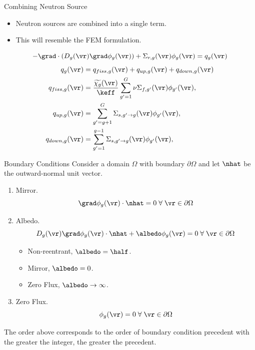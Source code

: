 \begin{frame}{Combining Neutron Source}
  \begin{itemize}
    \item Neutron sources are combined into a single term.
    \item This will resemble the FEM formulation.
  \end{itemize}
  \begin{equation}
    \label{eq:multigroup_source}
    - \grad \cdot( D_g(\vr) \grad \phi_g(\vr)) + \Sigma_{r,g}(\vr) \phi_g(\vr) = 
      q_g(\vr)
  \end{equation}
  \begin{align}
    \label{eq:q}
    q_g(\vr) &= q_{fiss,g}(\vr) + q_{up,g}(\vr) + q_{down,g}(\vr) \\
    \label{eq:qfiss}
    q_{fiss,g}(\vr) &= \frac{\widetilde{\chi_g}(\vr)}{\keff} \sum_{g'=1}^{G} 
      \nu \Sigma_{f,g'}(\vr) \phi_{g'}(\vr), \\
    \label{eq:qup}
    q_{up,g}(\vr) &= \sum_{g'=g+1}^{G} \Sigma_{s,g' \rightarrow g}(\vr)
      \phi_{g'}(\vr), \\
    \label{eq:qdown}
    q_{down,g}(\vr) &= \sum_{g'=1}^{g-1} \Sigma_{s,g' \rightarrow g}(\vr)
      \phi_{g'}(\vr),
  \end{align}
\end{frame}

\begin{frame}{Boundary Conditions}
  Consider a domain $\Omega$ with boundary $\partial \Omega$ and let $\nhat$ be
  the outward-normal unit vector.

  \begin{enumerate}
    \item Mirror.
      \begin{equation}
        \grad \phi_g(\vr) \cdot \nhat = 0 \; \forall \; \vr \in \partial \Omega
      \end{equation}
    \item Albedo. 
      \begin{equation}
        D_g(\vr) \grad \phi_g(\vr) \cdot \nhat + \albedo \phi_g(\vr)
          = 0 \; \forall \; \vr \in \partial \Omega
      \end{equation}
      \vspace{-0.2in}
      \begin{itemize}
        \item Non-reentrant, $\albedo = \half$.
        \item Mirror, $\albedo = 0$.
        \item Zero Flux, $\albedo \rightarrow \infty$.
      \end{itemize}
    \item Zero Flux. 
      \begin{equation}
        \phi_g(\vr) = 0 \; \forall \; \vr \in \partial \Omega
      \end{equation}
  \end{enumerate}

  The order above corresponds to the order of boundary condition precedent with 
  the greater the integer, the greater the precedent.
\end{frame}

